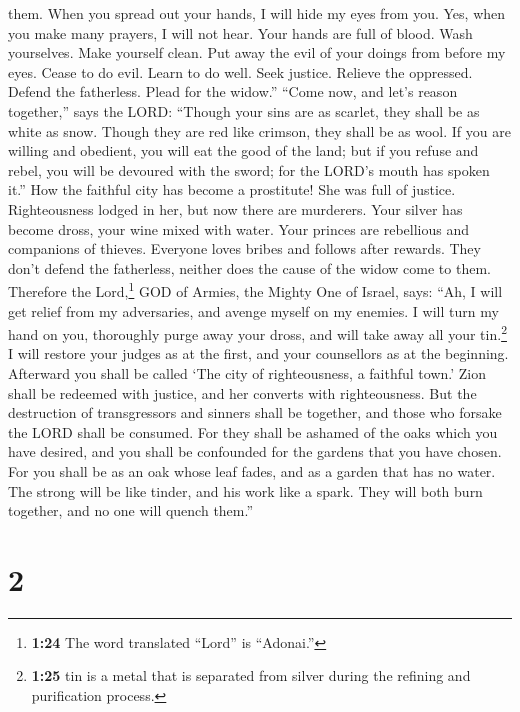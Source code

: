 them.  When you spread out your hands, I will hide my
eyes from you. Yes, when you make many prayers, I will not hear. Your
hands are full of blood.  Wash yourselves. Make yourself
clean. Put away the evil of your doings from before my eyes. Cease to do
evil.  Learn to do well. Seek justice. Relieve the
oppressed. Defend the fatherless. Plead for the widow.'' 
``Come now, and let's reason together,'' says the LORD: ``Though your
sins are as scarlet, they shall be as white as snow. Though they are red
like crimson, they shall be as wool.  If you are willing
and obedient, you will eat the good of the land;  but if
you refuse and rebel, you will be devoured with the sword; for the
LORD's mouth has spoken it.''  How the faithful city has
become a prostitute! She was full of justice. Righteousness lodged in
her, but now there are murderers.  Your silver has become
dross, your wine mixed with water.  Your princes are
rebellious and companions of thieves. Everyone loves bribes and follows
after rewards. They don't defend the fatherless, neither does the cause
of the widow come to them.  Therefore the
Lord,\footnote{\textbf{1:24} The word translated ``Lord'' is ``Adonai.''}
GOD of Armies, the Mighty One of Israel, says: ``Ah, I will get relief
from my adversaries, and avenge myself on my enemies.  I
will turn my hand on you, thoroughly purge away your dross, and will
take away all your tin.\footnote{\textbf{1:25} tin is a metal that is
  separated from silver during the refining and purification process.}
 I will restore your judges as at the first, and your
counsellors as at the beginning. Afterward you shall be called `The city
of righteousness, a faithful town.'  Zion shall be
redeemed with justice, and her converts with righteousness.
 But the destruction of transgressors and sinners shall
be together, and those who forsake the LORD shall be consumed.
 For they shall be ashamed of the oaks which you have
desired, and you shall be confounded for the gardens that you have
chosen.  For you shall be as an oak whose leaf fades, and
as a garden that has no water.  The strong will be like
tinder, and his work like a spark. They will both burn together, and no
one will quench them.''

\hypertarget{section-1}{%
\section{2}\label{section-1}}

